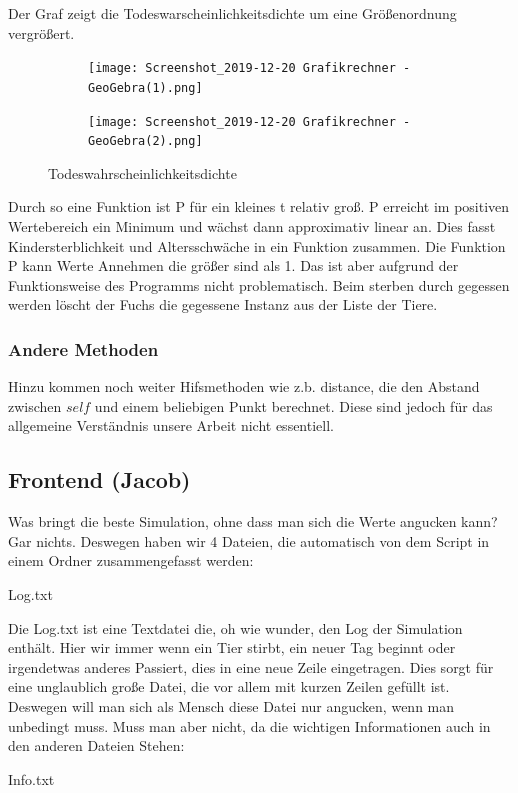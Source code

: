 \documentclass[12pt]{article}
\begin{document}
Der Graf zeigt die Todeswarscheinlichkeitsdichte um eine Größenordnung vergrößert.
\begin{figure}[h!]
  \centering
  \begin{subfigure}[b]{0.4\linewidth}
    \texttt{[image: Screenshot\_2019-12-20 Grafikrechner - GeoGebra(1).png]}
  \end{subfigure}
  \begin{subfigure}[b]{0.4\linewidth}
    \texttt{[image: Screenshot\_2019-12-20 Grafikrechner - GeoGebra(2).png]}
  \end{subfigure}
  \caption{Todeswahrscheinlichkeitsdichte}
  \label{fig:coffee}
\end{figure}
\newpage
Durch so eine Funktion ist P für ein kleines t relativ groß.
P erreicht im positiven Wertebereich ein Minimum und wächst dann approximativ linear an.
Dies fasst Kindersterblichkeit und Altersschwäche in ein Funktion zusammen.
Die Funktion P kann Werte Annehmen die größer sind als 1.
Das ist aber aufgrund der Funktionsweise des Programms nicht problematisch.
Beim sterben durch gegessen werden löscht der Fuchs die gegessene Instanz aus der Liste der Tiere.
\subsubsection{Andere Methoden}
Hinzu kommen noch weiter Hifsmethoden wie z.b. \colorbox{gray!40}{distance}, die
den Abstand zwischen $self$ und einem beliebigen Punkt berechnet.
Diese sind jedoch für das allgemeine Verständnis unsere Arbeit nicht essentiell.
\subsection{Frontend (Jacob)}
Was bringt die beste Simulation, ohne dass man sich die Werte angucken kann? Gar
nichts. Deswegen haben wir 4 Dateien, die automatisch von dem Script in einem Ordner
zusammengefasst werden:

 Log.txt

Die Log.txt ist eine Textdatei die, oh wie wunder, den Log der Simulation enthält.
Hier wir immer wenn ein Tier stirbt, ein neuer Tag beginnt oder irgendetwas anderes
Passiert, dies in eine neue Zeile eingetragen. Dies sorgt für eine unglaublich große
Datei, die vor allem mit kurzen Zeilen gefüllt ist. Deswegen will man sich als
Mensch diese Datei nur angucken, wenn man unbedingt muss. Muss man
aber nicht, da die wichtigen Informationen auch in den anderen Dateien Stehen:

Info.txt
    
\end{document}
